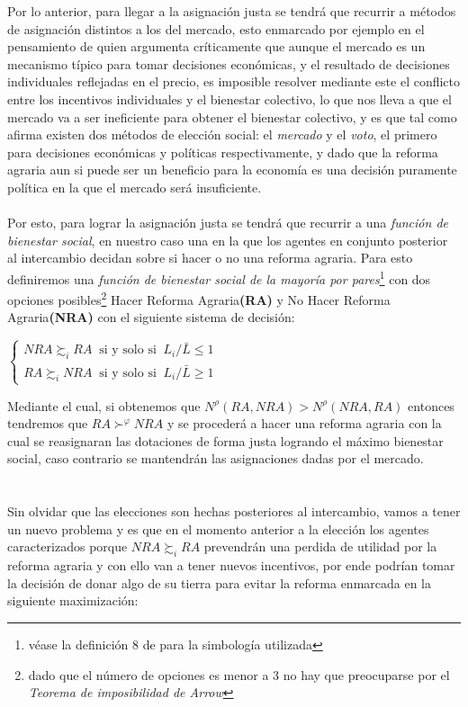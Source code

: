 \documentclass[11pt]{article}
\begin{document}
{\begin{flushleft}
    Por lo anterior, para llegar a la asignación justa se tendrá que recurrir a métodos de asignación distintos a los del mercado, esto enmarcado 
    por ejemplo en el pensamiento de \citet{arrow_1973} quien argumenta críticamente que aunque el mercado es un mecanismo típico para tomar decisiones económicas, 
    y el resultado de decisiones individuales reflejadas en el precio, es imposible resolver mediante este el conflicto entre los incentivos individuales y el bienestar colectivo,
    lo que nos lleva a que el mercado va a ser ineficiente para obtener el bienestar colectivo, y es que tal como afirma \citet{arrow_1951} existen dos métodos de elección social: 
    el \textit{mercado} y el \textit{voto}, el primero para decisiones económicas y políticas respectivamente, y dado que la reforma agraria aun si puede ser un beneficio para la 
    economía es una decisión puramente política en la que el mercado será insuficiente.
    \\~\\
    Por esto, para lograr la asignación justa se tendrá que recurrir a una \textit{función de bienestar social}, en nuestro caso una
    en la que los agentes en conjunto posterior al intercambio decidan sobre si hacer o no una reforma agraria. Para esto definiremos una
    \textit{función de bienestar social de la mayoría por pares}\footnote{véase la definición 8 de \citet{Lozano2022} para la simbología utilizada} con dos opciones posibles\footnote{dado que el número de opciones es menor a 3 no hay que preocuparse por el \textit{Teorema de imposibilidad de Arrow}}
    Hacer Reforma Agraria\textbf{(RA)} y No Hacer Reforma Agraria\textbf{(NRA)} con el siguiente sistema de decisión:

    \begin{center}

        $ 
     \begin{cases}
         NRA \succsim_i RA ~ \text{ si y solo si } ~  L_i/\bar{L} \le 1\\
         RA \succsim_i NRA ~ \text{ si y solo si } ~  L_i/\bar{L} \ge 1
     \end{cases}
         $
     \end{center}

     Mediante el cual, si obtenemos que $N^\rho(RA,NRA)>N^\rho(NRA,RA)$ entonces tendremos que $RA \succ^\varphi NRA$ y se procederá a hacer una reforma agraria
     con la cual se reasignaran las dotaciones de forma justa logrando el máximo bienestar social, caso contrario se mantendrán las asignaciones dadas por el mercado.
     \\~\\~\\
     Sin olvidar que las elecciones son hechas posteriores al intercambio, vamos a tener un nuevo problema y es que en el momento anterior a la elección 
     los agentes caracterizados porque $NRA \succsim_i RA$ prevendrán una perdida de utilidad por la reforma agraria y con ello van a tener nuevos incentivos, por ende podrían tomar la decisión de donar algo de su tierra para evitar la reforma enmarcada en la siguiente maximización:
     

\end{flushleft}}
\end{document}
